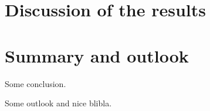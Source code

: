 

\chapter{Discussion of the results}
\label{chap:discussion}


\chapter{Summary and outlook}
\label{chap:summary}


Some conclusion.

Some outlook and nice blibla.